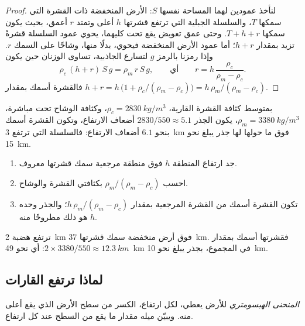 \begin{proof}
لنأخذ عمودين لهما المساحة نفسها $S$: الأرض المنخفضة ذات القشرة التي سمكها
$T$، والسلسلة الجبلية التي ترتفع قشرتها $h$ أعلى وتمتد $r$ أعمق، بحيث
يكون سمكها $T + h + r$. وحتى عمق تعويض يقع تحت 
كليهما، يحوي عمود السلسلة قشرةً تزيد بمقدار $h + r$؛ أما عمود الأرض المنخفضة فيحوي،
بدلًا منها، وشاحًا على السمك $r$. وإذا رمزنا بالرمز $g$ لتسارع الجاذبية،
تساوى الوزنان حين يكون
\[
  \rho_c\,(h + r)\,S\,g = \rho_m\,r\,S\,g,
  \qquad\text{أي}\qquad
  r = h\,\frac{\rho_c}{\rho_m - \rho_c}.
\]
فالقشرة أسمك بمقدار $h + r = h\,\bigl(1 + \rho_c/(\rho_m - \rho_c)\bigr)
= h\,\rho_m/(\rho_m - \rho_c)$.
\end{proof}

بمتوسط كثافة القشرة القارية، $\rho_c =
\qty{2830}{kg/m^3}$، وكثافة الوشاح تحت  مباشرة، $\rho_m =
\qty{3380}{kg/m^3}$، يكون الجذر $2830/550 \approx 5.1$ أضعاف الارتفاع،
وتكون القشرة أسمك بنحو $6.1$ أضعاف الارتفاع: فالسلسلة التي ترتفع
\qty{3}{km} فوق ما حولها لها جذر يبلغ نحو \qty{15}{km}.

\begin{method}\label{met:g11:lithosphere-asthenosphere:root}
\begin{enumerate}
  \item جد ارتفاع المنطقة $h$ فوق منطقة مرجعية سمك قشرتها
        معروف.
  \item احسب $\rho_m/(\rho_m - \rho_c)$ بكثافتي القشرة
        والوشاح.
  \item تكون القشرة أسمك من القشرة المرجعية بمقدار $h\,\rho_m/(\rho_m -
        \rho_c)$؛ والجذر وحده هو ذلك مطروحًا منه $h$.
\end{enumerate}
\end{method}

\begin{example}\label{ex:g11:lithosphere-asthenosphere:plateau}
ترتفع هضبة \qty{2}{km} فوق أرض منخفضة سمك قشرتها \qty{37}{km}.
فقشرتها أسمك بمقدار $2 \times 3380/550 \approx \qty{12.3}{km}$:
أي نحو \qty{49}{km} في المجموع، بجذر يبلغ نحو \qty{10}{km}.
\end{example}

\subsection{لماذا ترتفع القارات}

\begin{definition}\label{def:g11:lithosphere-asthenosphere:hypsometry}
\emph{المنحنى الهبسومتري} للأرض يعطي، لكل
ارتفاع، الكسر من سطح الأرض الذي يقع أعلى منه.
ويبيّن ميله مقدار ما يقع من السطح عند كل ارتفاع.
\end{definition}

